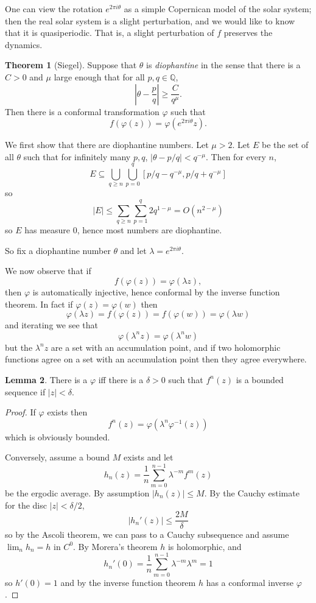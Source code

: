 \documentclass[12pt]{report}
\newcommand{\QQ}{\mathbb{Q}}
\newcommand{\dfn}[1]{\emph{#1}\index{#1}}
\theoremstyle{definition}
\newtheorem{theorem}{Theorem}[chapter]
\newtheorem{lemma}[theorem]{Lemma}
\begin{document}
One can view the rotation $e^{2\pi i \theta}$ as a simple Copernican model of the solar system; then the real solar system is a slight perturbation, and we would like to know that it is quasiperiodic. That is, a slight perturbation of $f$ preserves the dynamics.

\begin{theorem}[Siegel]
Suppose that $\theta$ is \dfn{diophantine} in the sense that there is a $C>0$ and $\mu$ large enough that for all $p, q \in \QQ$,
$$\left|\theta - \frac{p}{q}\right| \geq \frac{C}{q^\mu}.$$
Then there is a conformal transformation $\varphi$ such that
$$f(\varphi(z)) = \varphi(e^{2\pi i \theta}z).$$
\end{theorem}

We first show that there are diophantine numbers. Let $\mu > 2$.
Let $E$ be the set of all $\theta$ such that for infinitely many $p, q$, $|\theta - p/q| < q^{-\mu}$. Then for every $n$,
$$E \subseteq \bigcup_{q \geq n}\bigcup_{p=0}^q [p/q- q^{-\mu}, p/q + q^{-\mu}]$$
so
$$|E| \leq \sum_{q \geq n}\sum_{p = 1}^q 2q^{1-\mu} = O(n^{2-\mu})$$
so $E$ has measure $0$, hence most numbers are diophantine.

So fix a diophantine number $\theta$ and let $\lambda = e^{2\pi i\theta}$.

We now observe that if
$$f(\varphi(z)) = \varphi(\lambda z),$$
then $\varphi$ is automatically injective, hence conformal by the inverse function theorem. In fact if $\varphi(z) = \varphi(w)$ then
$$\varphi(\lambda z) = f(\varphi(z)) = f(\varphi(w)) = \varphi(\lambda w)$$
and iterating we see that
$$\varphi(\lambda^n z) = \varphi(\lambda^n w)$$
but the $\lambda^n z$ are a set with an accumulation point, and if two holomorphic functions agree on a set with an accumulation point then they agree everywhere.

\begin{lemma}
There is a $\varphi$ iff there is a $\delta > 0$ such that $f^n(z)$ is a bounded sequence if $|z| < \delta$.
\end{lemma}
\begin{proof}
If $\varphi$ exists then
$$f^n(z) = \varphi(\lambda^n \varphi^{-1}(z))$$
which is obviously bounded.

Conversely, assume a bound $M$ exists and let
$$h_n(z) = \frac{1}{n}\sum_{m=0}^{n-1} \lambda^{-m} f^m(z)$$
be the ergodic average. By assumption $|h_n(z)| \leq M$. By the Cauchy estimate for the disc $|z| < \delta/2$,
$$|h_n'(z)| \leq \frac{2M}{\delta}$$
so by the Ascoli theorem, we can pass to a Cauchy subsequence and assume $\lim_n h_n = h$ in $C^0$.
By Morera's theorem $h$ is holomorphic, and
$$h_n'(0) = \frac{1}{n} \sum_{m=0}^{n-1} \lambda^{-m} \lambda^m = 1$$
so $h'(0) = 1$ and by the inverse function theorem $h$ has a conformal inverse $\varphi$.
\end{proof}
\end{document}
